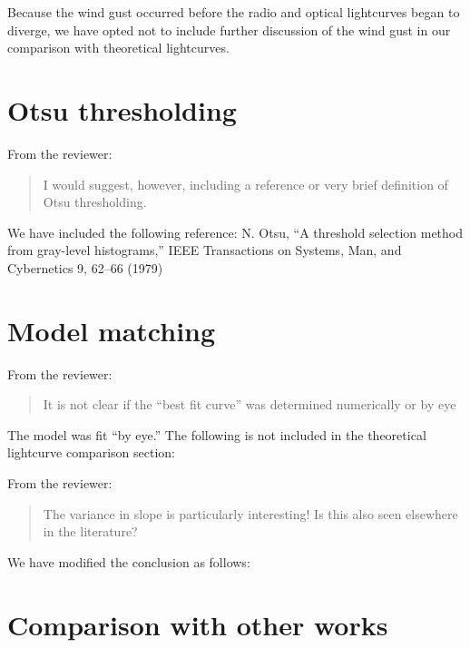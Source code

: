 \documentclass{article}
\begin{document}
\noindent Because the wind gust occurred before the radio and optical lightcurves began to diverge, we have opted not to include further discussion of the wind gust in our comparison with theoretical lightcurves.

\section{Otsu thresholding}

From the reviewer:

\begin{quote}
  I would suggest, however, including a reference or very brief definition of Otsu thresholding.
\end{quote}

\noindent We have included the following reference: N. Otsu, “A threshold selection method from gray-level histograms,” IEEE Transactions on Systems, Man, and Cybernetics 9, 62–66 (1979)

\section{Model matching}

From the reviewer:

\begin{quote}
  It is not clear if the ``best fit curve'' was determined numerically or by eye
\end{quote}

\noindent The model was fit ``by eye.'' The following is not included in the theoretical lightcurve comparison section:

\begin{quote}
  
\end{quote}

\noindent From the reviewer:

\begin{quote}

  The variance in slope is particularly interesting! Is this also seen elsewhere in the literature?

\end{quote}

\noindent We have modified the conclusion as follows:

\begin{quote}
  
\end{quote}

\section{Comparison with other works}
\end{document}
